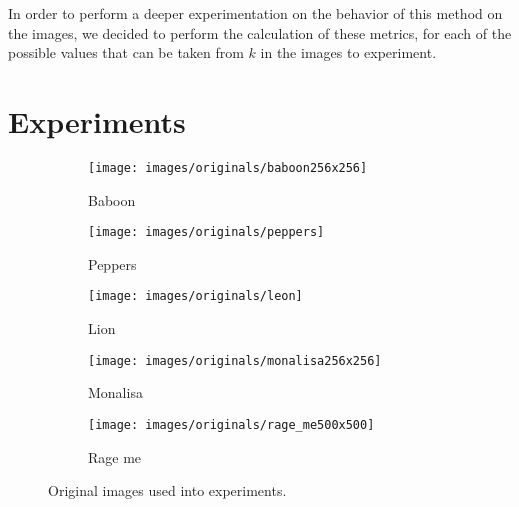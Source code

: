 \documentclass[journal]{IEEEtran}
\begin{document}
In order to perform a deeper experimentation on the behavior of this method on the images, we decided to perform the calculation of these metrics, for each of the possible values that can be taken from $k$ in the images to experiment.

\section{Experiments}
\label{sec:experiments}

\begin{figure}
	\centering
	\begin{subfigure}{0.23\textwidth}
		\centering
		\texttt{[image: images/originals/baboon256x256]} 
		\caption{Baboon}
		\label{fig:originals:baboon} 
	\end{subfigure}
	\centering
	\begin{subfigure}{0.23\textwidth}
		\centering
		\texttt{[image: images/originals/peppers]} 
		\caption{Peppers}
		\label{fig:originals:peppers} 
	\end{subfigure}
	
	\centering
	\begin{subfigure}{0.465\textwidth}
		\centering
		\texttt{[image: images/originals/leon]}
		\caption{Lion}
		\label{fig:originals:lion}
	\end{subfigure}
	
	\centering
	\begin{subfigure}{0.23\textwidth}
		\centering
		\texttt{[image: images/originals/monalisa256x256]}
		\caption{Monalisa}
		\label{fig:originals:monalisa}
	\end{subfigure}
	\centering
	\begin{subfigure}{0.23\textwidth}
		\centering
		\texttt{[image: images/originals/rage\_me500x500]}
		\caption{Rage me}
		\label{fig:originals:rage_me}
	\end{subfigure}
	
	\caption{Original images used into experiments.}
	\label{fig:img:originals}
\end{figure}
\end{document}
